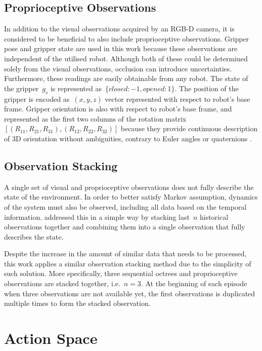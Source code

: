 \subsection{Proprioceptive Observations}\label{subsec:problem_formulation_proprioceptive_observations}

In addition to the visual observations acquired by an RGB-D camera, it is considered to be beneficial to also include proprioceptive observations. Gripper pose and gripper state are used in this work because these observations are independent of the utilised robot. Although both of these could be determined solely from the visual observations, occlusion can introduce uncertainties. Furthermore, these readings are easily obtainable from any robot. The state of the gripper~\(g_{s}\) is represented as~\(\{closed: -1, opened: 1\}\). The position of the gripper is encoded as~\((x,y,z)\) vector represented with respect to robot's base frame. Gripper orientation is also with respect to robot's base frame, and represented as the first two columns of the rotation matrix~\([(R_{11},R_{21},R_{31}),(R_{12},R_{22},R_{32})]\) because they provide continuous description of 3D orientation without ambiguities, contrary to Euler angles or quaternions \cite{zhou_continuity_2020}.


\subsection{Observation Stacking}\label{subsec:observation_stacking}

A single set of visual and proprioceptive observations does not fully describe the state of the environment. In order to better satisfy Markov assumption, dynamics of the system must also be observed, including all data based on the temporal information. \citet{mnih_human-level_2015} addressed this in a simple way by stacking last~\(n\) historical observations together and combining them into a single observation that fully describes the state.

Despite the increase in the amount of similar data that needs to be processed, this work applies a similar observation stacking method due to the simplicity of such solution. More specifically, three sequential octrees and proprioceptive observations are stacked together, i.e.~\(n = 3\). At the beginning of each episode when three observations are not available yet, the first observations is duplicated multiple times to form the stacked observation.


\section{Action Space}

